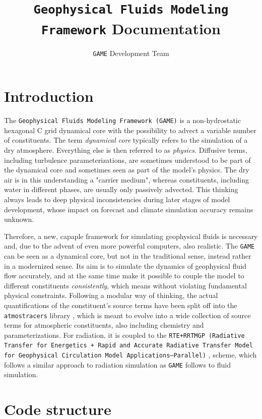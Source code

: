 \documentclass[10pt]{report}
\title{\texttt{Geophysical Fluids Modeling Framework} Documentation}
\author{\texttt{GAME} Development Team}
\date{}
\begin{document}
\maketitle
\tableofcontents

\chapter{Introduction}
\label{chap:introduction}

The \texttt{Geophysical Fluids Modeling Framework (GAME)} is a non-hydrostatic hexagonal C grid dynamical core with the possibility to advect a variable number of constituents. The term \textit{dynamical core} typically refers to the simulation of a dry atmosphere. Everything else is then referred to as \textit{physics}. Diffusive terms, including turbulence parameterizations, are sometimes understood to be part of the dynamical core and sometimes seen as part of the model's physics. The dry air is in this understanding a "carrier medium", whereas constituents, including water in different phases, are usually only passively advected. This thinking always leads to deep physical inconsistencies during later stages of model development, whose impact on forecast and climate simulation accuracy remains unknown.

Therefore, a new, capaple framework for simulating geophysical fluids is necessary and, due to the advent of even more powerful computers, also realistic. The \texttt{GAME} can be seen as a dynamical core, but not in the traditional sense, instead rather in a modernized sense. Its aim is to simulate the dynamics of geophysical fluid flow accurately, and at the same time make it possible to couple the model to different constituents \textit{consistently}, which means without violating fundamental physical constraints. Following a modular way of thinking, the actual quantifications of the constituent's source terms have been split off into the \texttt{atmostracers} library \cite{atmostracers-github}, which is meant to evolve into a wide collection of source terms for atmospheric constituents, also including chemistry and parameterizations. For radiation, it is coupled to the \texttt{RTE+RRTMGP (Radiative Transfer for Energetics + Rapid and Accurate Radiative Transfer Model for Geophysical Circulation Model Applications—Parallel)} \cite{doi:10.1029/2019MS001621}, \cite{rte-rrtmgp-github} scheme, which follows a similar approach to radiation simulation as \texttt{GAME} follows to fluid simulation.

\chapter{Code structure}
\label{chap:code_structure}
\end{document}
